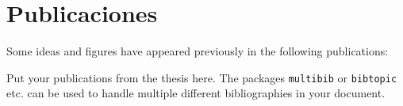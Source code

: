 

\chapter*{Publicaciones} %

Some ideas and figures have appeared previously in the following publications:

\bigskip

\noindent Put your publications from the thesis here. The packages \texttt{multibib} or \texttt{bibtopic} etc. can be used to handle multiple different bibliographies in your document.